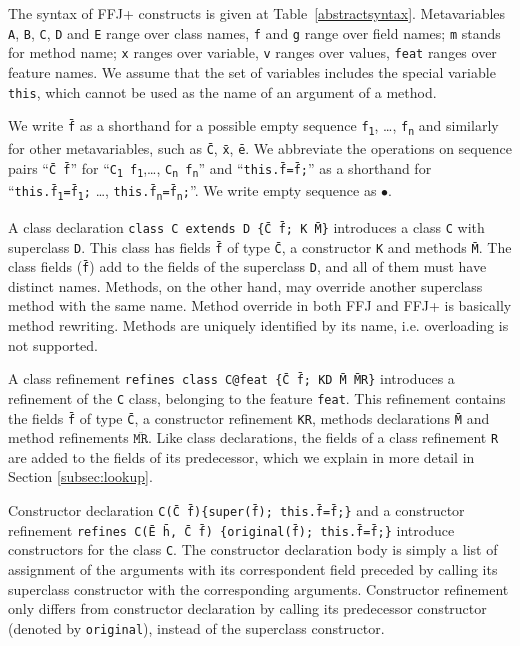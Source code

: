 The syntax of \ac{FFJ+} constructs is given at Table~\ref{abstractsyntax}. Metavariables
\texttt{A}, \texttt{B}, \texttt{C}, \texttt{D} and \texttt{E} range over class names, \texttt{f} and \texttt{g} range over
field names; \texttt{m} stands for method name; \texttt{x} ranges over variable, \texttt{v} ranges over
values, \texttt{feat} ranges over feature names. We assume that the set of variables includes the special variable \texttt{this}, which
cannot be used as the name of an argument of a method.

We write \texttt{\=f} as a shorthand for a possible empty sequence \texttt{f\textsubscript1}, \dots, \texttt{f\textsubscript{n}} 
and similarly for other metavariables, such as \texttt{\=C}, \texttt{\=x}, \texttt{\=e}. We abbreviate the operations on sequence pairs
``\texttt{\=C~\=f}'' for ``\texttt{C\textsubscript1~f\textsubscript1},\dots, \texttt{C\textsubscript{n}~f\textsubscript{n}}''
and ``\texttt{this.\=f=\=f;}'' as a shorthand for 
``\texttt{this.\=f\textsubscript1=\=f\textsubscript1;} \dots, \texttt{this.\=f\textsubscript{n}=\=f\textsubscript{n};}''.
We write empty sequence as $\bullet$.


A class declaration \texttt{class\ C~extends~D\ \{\={C} \={f}; K \={M}\}} 
introduces a class \texttt{C} with superclass \texttt{D}. This class has fields \texttt{\=f}
of type \texttt{\=C}, a constructor \texttt{K} and methods \texttt{\=M}. The class fields (\texttt{\=f}) 
add to the fields of the superclass \texttt{D}, and all of them must have distinct names.
Methods, on the other hand, may override another superclass method with the same name.
Method override in both \ac{FFJ} and \ac{FFJ+} is basically method rewriting. 
Methods are uniquely identified by its name, i.e. overloading is not supported.

A class refinement \texttt{refines~class~C@feat~\{\={C}~\={f};~KD~\={M}~\={MR}\}}
introduces a refinement of the \texttt{C} class, belonging to the feature \texttt{feat}. 
This refinement contains the fields \texttt{\=f} of type \texttt{\=C}, 
a constructor refinement \texttt{KR}, methods declarations \texttt{\=M} and method refinements $\overline{\texttt{MR}}$.
Like class declarations, the fields of a class refinement \texttt{R} are added to the fields of its predecessor, which
we explain in more detail in Section \ref{subsec:lookup}.

Constructor declaration \texttt{C(\={C}~\={f})\{super(\={f}); this.\={f}=\={f};\}} and a constructor refinement 
\texttt{refines~C(\={E}~\={h}, \={C}~\={f}) \{original(\={f}); this.\={f}=\={f};\}} introduce constructors 
for the class \texttt{C}. The constructor declaration body is simply 
a list of assignment of the arguments with its correspondent field preceded by calling 
its superclass constructor with the corresponding arguments.
Constructor refinement only differs from constructor declaration by calling its predecessor constructor (denoted by \texttt{original}), 
instead of the superclass constructor.

